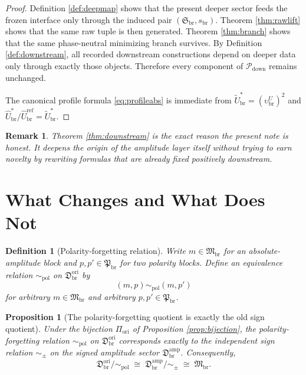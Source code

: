 \documentclass[11pt]{article}
\newcommand{\RespShapeEq}{\widetilde U_{\mathrm{br}}^{\ast}}
\newcommand{\RespRawRef}{\widehat U_{\mathrm{br}}^{\mathrm{ref}}}
\newcommand{\RespRawEq}{\widehat U_{\mathrm{br}}^{\ast}}
\newcommand{\DownPkg}{\mathscr P_{\mathrm{down}}}
\newcommand{\ShapeTuple}{\mathfrak S_{\mathrm{br}}}
\newcommand{\ScaleMod}{s_{\mathrm{br}}}
\newcommand{\LiftSector}{\mathfrak D_{\mathrm{br}}^{\mathrm{amp}}}
\newcommand{\SignQuot}{\sim_{\pm}}
\newcommand{\AbsAmpSector}{\mathfrak M_{\mathrm{br}}}
\newcommand{\PolaritySector}{\mathfrak P_{\mathrm{br}}}
\newcommand{\OriginSector}{\mathfrak D_{\mathrm{br}}^{\mathrm{ori}}}
\newcommand{\AbsEqAmp}{\upsilon_{\mathrm{br}}^{U}}
\newcommand{\OriginMap}{\Pi_{\mathrm{ori}}}
\newcommand{\PolarityQuot}{\sim_{\mathrm{pol}}}
\newtheorem{definition}{Definition}
\newtheorem{proposition}{Proposition}
\newtheorem{remark}{Remark}
\begin{document}
\begin{proof}
Definition \ref{def:deepmap} shows that the present deeper sector feeds the frozen interface only through the induced pair \((\ShapeTuple,\ScaleMod)\). Theorem \ref{thm:rawlift} shows that the same raw tuple is then generated. Theorem \ref{thm:branch} shows that the same phase-neutral minimizing branch survives. By Definition \ref{def:downstream}, all recorded downstream constructions depend on deeper data only through exactly those objects. Therefore every component of \(\DownPkg\) remains unchanged.

The canonical profile formula \eqref{eq:profileabs} is immediate from \(\RespShapeEq=(\AbsEqAmp)^2\) and \(\RespRawEq/\RespRawRef=\RespShapeEq\).
\end{proof}

\begin{remark}
Theorem \ref{thm:downstream} is the exact reason the present note is honest. It deepens the origin of the amplitude layer itself without trying to earn novelty by rewriting formulas that are already fixed positively downstream.
\end{remark}

\section{What Changes and What Does Not}

\begin{definition}[Polarity-forgetting relation]
\label{def:polquot}
Write \(m\in\AbsAmpSector\) for an absolute-amplitude block and \(p,p'\in\PolaritySector\) for two polarity blocks. Define an equivalence relation \(\PolarityQuot\) on \(\OriginSector\) by
\begin{equation}
(m,p)\PolarityQuot(m,p')
\label{eq:polquot}
\end{equation}
for arbitrary \(m\in\AbsAmpSector\) and arbitrary \(p,p'\in\PolaritySector\).
\end{definition}

\begin{proposition}[The polarity-forgetting quotient is exactly the old sign quotient]
\label{prop:samequot}
Under the bijection \(\OriginMap\) of Proposition \ref{prop:bijection}, the polarity-forgetting relation \(\PolarityQuot\) on \(\OriginSector\) corresponds exactly to the independent sign relation \(\SignQuot\) on the signed amplitude sector \(\LiftSector\). Consequently,
\begin{equation}
\OriginSector/\PolarityQuot
\;\cong\;
\LiftSector/\SignQuot
\;\cong\;
\AbsAmpSector.
\label{eq:quotientchain}
\end{equation}
\end{proposition}
\end{document}
